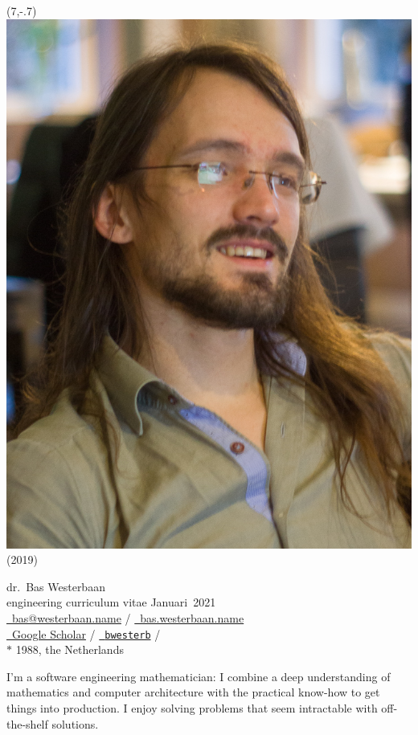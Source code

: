 \documentclass{article}
\newcommand\hsep{ {\color{gray}/} }
\begin{document}
\begin{textblock}{2}(7,-.7)
    \noindent
\includegraphics[width=\textwidth]{me}
        \footnotesize(2019)
\end{textblock}\noindent
\textsf{\Large dr.~Bas Westerbaan}\\
engineering curriculum vitae Januari~2021\\

\noindent
\href{mailto:bas@westerbaan.name}{\faEnvelopeO\ bas@westerbaan.name} \hsep
\href{https://bas.westerbaan.name}{\faExternalLink\ bas.westerbaan.name}\\
\href{https://scholar.google.nl/citations?user=AN7BEa8AAAAJ}{%
    \faGraduationCap\ Google Scholar}
    \hsep \href{https://github.com/bwesterb}{\faGithub\ \texttt{bwesterb}}
    \hsep \href{https://www.linkedin.com/in/baswesterbaan/}{\faLinkedinSquare} \\
$*$ 1988, the Netherlands

\vskip0.3cm\noindent
I'm a software engineering mathematician: I combine a deep understanding
    of mathematics and computer architecture
    with the practical know-how to get things into production.
    I enjoy solving  problems that seem intractable
        with off-the-shelf solutions.
\end{document}
